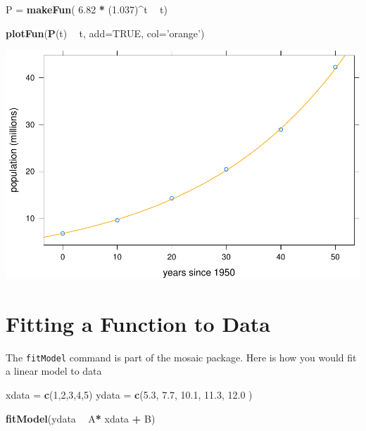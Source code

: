 \documentclass[
]{book}
\newenvironment{Shaded}{\begin{snugshade}}{\end{snugshade}}
\newcommand{\DataTypeTok}[1]{\textcolor[rgb]{0.13,0.29,0.53}{#1}}
\newcommand{\DecValTok}[1]{\textcolor[rgb]{0.00,0.00,0.81}{#1}}
\newcommand{\FloatTok}[1]{\textcolor[rgb]{0.00,0.00,0.81}{#1}}
\newcommand{\KeywordTok}[1]{\textcolor[rgb]{0.13,0.29,0.53}{\textbf{#1}}}
\newcommand{\NormalTok}[1]{#1}
\newcommand{\OperatorTok}[1]{\textcolor[rgb]{0.81,0.36,0.00}{\textbf{#1}}}
\newcommand{\OtherTok}[1]{\textcolor[rgb]{0.56,0.35,0.01}{#1}}
\newcommand{\StringTok}[1]{\textcolor[rgb]{0.31,0.60,0.02}{#1}}
\begin{document}
\begin{Shaded}
\begin{Highlighting}[]
\NormalTok{P =}\StringTok{ }\KeywordTok{makeFun}\NormalTok{( }\FloatTok{6.82} \OperatorTok{*}\StringTok{ }\NormalTok{(}\FloatTok{1.037}\NormalTok{)}\OperatorTok{^}\NormalTok{t }\OperatorTok{~}\StringTok{ }\NormalTok{t)}

\KeywordTok{plotFun}\NormalTok{(}\KeywordTok{P}\NormalTok{(t) }\OperatorTok{~}\StringTok{ }\NormalTok{t, }\DataTypeTok{add=}\OtherTok{TRUE}\NormalTok{, }\DataTypeTok{col=}\StringTok{'orange'}\NormalTok{)}
\end{Highlighting}
\end{Shaded}

\includegraphics{_bookdown_files/math135_handbook_files/figure-latex/unnamed-chunk-34-2.pdf}

\hypertarget{fitting-a-function-to-data}{%
\section{Fitting a Function to Data}\label{fitting-a-function-to-data}}

The \texttt{fitModel} command is part of the mosaic package. Here is how you would fit a linear model to data

\begin{Shaded}
\begin{Highlighting}[]
\NormalTok{xdata =}\StringTok{ }\KeywordTok{c}\NormalTok{(}\DecValTok{1}\NormalTok{,}\DecValTok{2}\NormalTok{,}\DecValTok{3}\NormalTok{,}\DecValTok{4}\NormalTok{,}\DecValTok{5}\NormalTok{)}
\NormalTok{ydata =}\StringTok{ }\KeywordTok{c}\NormalTok{(}\FloatTok{5.3}\NormalTok{, }\FloatTok{7.7}\NormalTok{, }\FloatTok{10.1}\NormalTok{, }\FloatTok{11.3}\NormalTok{, }\FloatTok{12.0}\NormalTok{    )}

\KeywordTok{fitModel}\NormalTok{(ydata  }\OperatorTok{~}\StringTok{ }\NormalTok{A}\OperatorTok{*}\StringTok{ }\NormalTok{xdata  }\OperatorTok{+}\StringTok{ }\NormalTok{B)}
\end{Highlighting}
\end{Shaded}
\end{document}
